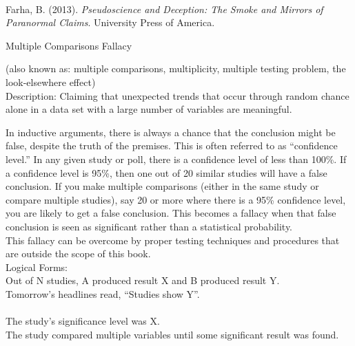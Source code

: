 \documentclass[a4paper,12pt,single,pdftex]{scrbook}
\begin{document}
        
      \\

      
        
          Farha, B. (2013). {\it Pseudoscience and Deception: The Smoke and Mirrors of Paranormal Claims}. University Press of America.
        
      
    
  

Multiple Comparisons Fallacy
    
      (also known as: multiple comparisons, multiplicity, multiple testing problem, the look-elsewhere effect)
    \\

  
    Description: Claiming that unexpected trends that occur through random chance alone in a data set with a large number of variables are meaningful.

    
      In inductive arguments, there is always a chance that the conclusion might be false, despite the truth of the premises. This is often referred to as “confidence level.” In any given study or poll, there is a confidence level of less than 100\%. If a confidence level is 95\%, then one out of 20 similar studies will have a false conclusion. If you make multiple comparisons (either in the same study or compare multiple studies), say 20 or more where there is a 95\% confidence level, you are likely to get a false conclusion. This becomes a fallacy when that false conclusion is seen as significant rather than a statistical probability.
    \\

    
      This fallacy can be overcome by proper testing techniques and procedures that are outside the scope of this book.
    \\

    
      Logical Forms:
    \\

    
      Out of N studies, A produced result X and B produced result Y.
    \\

    
      Tomorrow’s headlines read, “Studies show Y”.
    \\

    
      
    \\

    
      The study’s significance level was X.
    \\

    
      The study compared multiple variables until some significant result was found.
    \\
\end{document}
